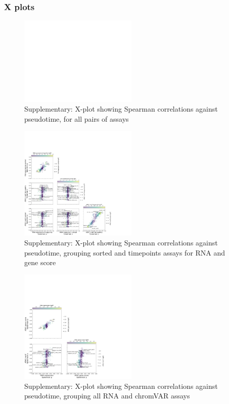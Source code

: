 \documentclass[a4paper]{article}
\begin{document}
\FloatBarrier
\subsubsection{X plots}
 
\begin{figure}[!htb]
  \centering
  \includegraphics[width=0.5\textwidth]{../figures/hematopoiesis/Myeloid DC_40_107_smooth_none_detailed_X_plot.png}
  \caption{Supplementary: X-plot showing Spearman correlations against pseudotime, for all pairs of assays}
\end{figure}

\begin{figure}[!htb]
  \centering
  \includegraphics[width=0.5\textwidth]{../figures/hematopoiesis/Myeloid DC_40_107_smooth_none_semi_detailed_X_plot.png}
  \caption{Supplementary: X-plot showing Spearman correlations against pseudotime, grouping sorted and timepoints assays for RNA and gene score}
\end{figure}

\begin{figure}[!htb]
  \centering
  \includegraphics[width=0.5\textwidth]{../figures/hematopoiesis/Myeloid DC_40_107_smooth_none_grouped_X_plot.png}
  \caption{Supplementary: X-plot showing Spearman correlations against pseudotime, grouping all RNA and chromVAR assays}
\end{figure}
\end{document}

